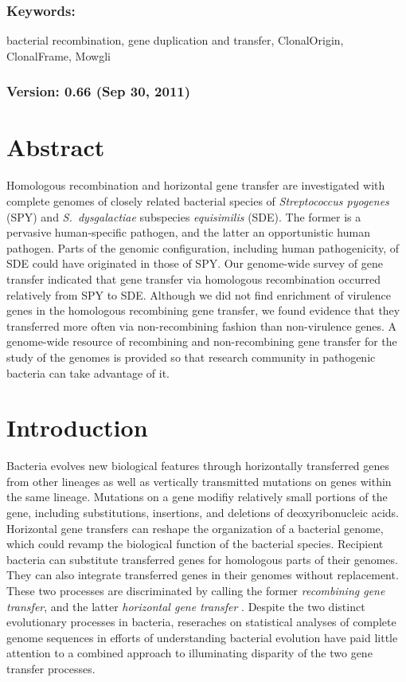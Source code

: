 \documentclass[english]{article}
\begin{document}
\subsubsection*{Keywords:}

bacterial recombination, gene duplication and transfer, ClonalOrigin,
ClonalFrame, Mowgli


\subsubsection*{Version: 0.66 (Sep 30, 2011) \clearpage{}}


\section*{Abstract}
Homologous recombination and horizontal gene transfer are investigated
with complete genomes of closely related bacterial species of 
\emph{Streptococcus pyogenes} (SPY) 
and \emph{S.\ dysgalactiae} subspecies \emph{equisimilis} (SDE).
The former is a pervasive human-specific pathogen, and the latter
an opportunistic human pathogen.  Parts of the genomic configuration, including
human pathogenicity, of SDE could have originated in those of SPY.  
Our genome-wide survey of gene transfer indicated that gene transfer via homologous
recombination occurred relatively from SPY to SDE.
Although we did not find enrichment of virulence genes in the homologous recombining gene
transfer, we found evidence that they transferred more often via
non-recombining fashion than non-virulence genes. 
A genome-wide resource of recombining and non-recombining gene transfer for the study of the
genomes is provided so that research community in pathogenic bacteria can take
advantage of it.

\clearpage{}


\section{Introduction}

Bacteria evolves new biological features through horizontally transferred genes
from other lineages as well as vertically transmitted mutations on genes within
the same lineage.  Mutations on a gene modifiy relatively small portions of the
gene, including substitutions, insertions, and deletions of deoxyribonucleic
acids. Horizontal gene transfers can reshape the organization of a bacterial
genome, which could revamp the biological function of the bacterial species.
Recipient bacteria can substitute transferred genes for homologous parts of
their genomes. They can also integrate transferred genes in their genomes
without replacement. These two processes are discriminated by calling the former
\textit{recombining gene transfer}, and the latter 
\textit{horizontal gene transfer} \citep{Ochman2001,Lawrence2009}.  
Despite the two distinct evolutionary processes in bacteria, reseraches on
statistical analyses of complete genome sequences in efforts of understanding
bacterial evolution have paid little attention to a combined approach to
illuminating disparity of the two gene transfer processes. 
\end{document}
